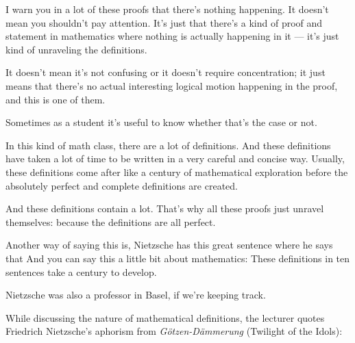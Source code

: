 \begin{speech}[00:58:38 - 01:00:16]
I warn you in a lot of these proofs that there's nothing happening. It doesn't mean you shouldn't pay attention. It's just that there's a kind of proof and statement in mathematics where nothing is actually happening in it --- it's just kind of unraveling the definitions.

It doesn't mean it's not confusing or it doesn't require concentration; it just means that there's no actual interesting logical motion happening in the proof, and this is one of them.

Sometimes as a student it's useful to know whether that's the case or not.

In this kind of math class, there are a lot of definitions. And these definitions have taken a lot of time to be written in a very careful and concise way. Usually, these definitions come after like a century of mathematical exploration before the absolutely perfect and complete definitions are created.

And these definitions contain a lot. That's why all these proofs just unravel themselves: because the definitions are all perfect.

Another way of saying this is, Nietzsche has this great sentence where he says that  And you can say this a little bit about mathematics: These definitions in ten sentences take a century to develop.

Nietzsche was also a professor in Basel, if we're keeping track.
\end{speech}

\begin{note}
While discussing the nature of mathematical definitions, the lecturer quotes Friedrich Nietzsche's aphorism from \emph{Götzen-Dämmerung} (Twilight of the Idols): 
\end{note}

